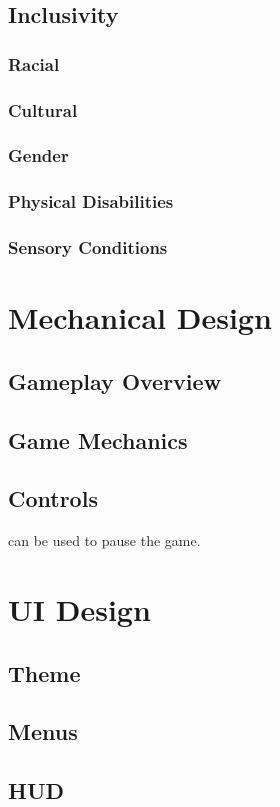 \subsection{Inclusivity}
\subsubsection{Racial}
\subsubsection{Cultural}
\subsubsection{Gender}
\subsubsection{Physical Disabilities}
\subsubsection{Sensory Conditions}

\section{Mechanical Design}
\subsection{Gameplay Overview}
\subsection{Game Mechanics}
\subsection{Controls}

 can be used to pause the game.

\section{UI Design}
\subsection{Theme}
\subsection{Menus}
\subsection{HUD}

